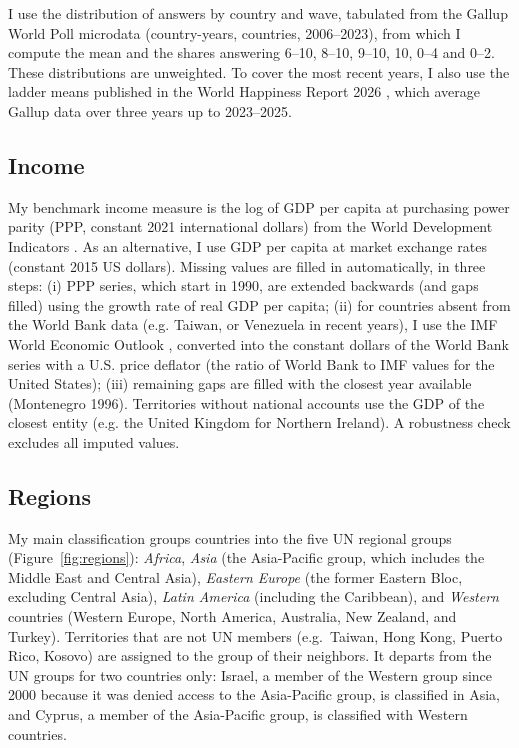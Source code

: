 \documentclass[11pt]{article}
\begin{document}
I use the distribution of answers by country and wave, tabulated from the Gallup World Poll microdata (\nGallupCountryYears country-years, \nGallupCountries countries, 2006--2023), from which I compute the mean and the shares answering 6--10, 8--10, 9--10, 10, 0--4 and 0--2. These distributions are unweighted. To cover the most recent years, I also use the ladder means published in the World Happiness Report 2026 \citep{whr_2026}, which average Gallup data over three years up to 2023--2025.

\subsection{Income}\label{subsec:income}
My benchmark income measure is the log of GDP per capita at purchasing power parity (PPP, constant 2021 international dollars) from the World Development Indicators \citep{worldbank_wdi_2026}. As an alternative, I use GDP per capita at market exchange rates (constant 2015 US dollars). Missing values are filled in automatically, in three steps: (i) PPP series, which start in 1990, are extended backwards (and gaps filled) using the growth rate of real GDP per capita; (ii) for countries absent from the World Bank data (e.g. Taiwan, or Venezuela in recent years), I use the IMF World Economic Outlook \citep{imf_weo_2026}, converted into the constant dollars of the World Bank series with a U.S. price deflator (the ratio of World Bank to IMF values for the United States); (iii) remaining gaps are filled with the closest year available (Montenegro 1996). Territories without national accounts use the GDP of the closest entity (e.g. the United Kingdom for Northern Ireland). A robustness check excludes all imputed values.

\subsection{Regions}\label{subsec:regions}
My main classification groups countries into the five UN regional groups (Figure~\ref{fig:regions}): \textit{Africa}, \textit{Asia} (the Asia-Pacific group, which includes the Middle East and Central Asia), \textit{Eastern Europe} (the former Eastern Bloc, excluding Central Asia), \textit{Latin America} (including the Caribbean), and \textit{Western} countries (Western Europe, North America, Australia, New Zealand, and Turkey). Territories that are not UN members (e.g.\ Taiwan, Hong Kong, Puerto Rico, Kosovo) are assigned to the group of their neighbors. 
It departs from the UN groups for two countries only: Israel, a member of the Western group since 2000 because it was denied access to the Asia-Pacific group, is classified in Asia, and Cyprus, a member of the Asia-Pacific group, is classified with Western countries. 
\end{document}

